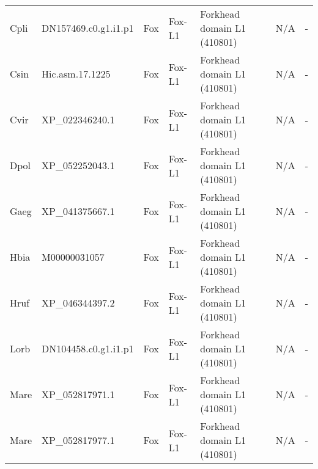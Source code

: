 \documentclass[../main.tex]{subfiles}
\begin{document}
\begin{landscape}
\begin{longtable}{lllllll}
		Cpli           & DN157469.c0.g1.i1.p1  & Fox            & Fox-L1              & Forkhead domain L1 (410801)                 & N/A                                                                    & -                    \\
		Csin           & Hic.asm.17.1225       & Fox            & Fox-L1              & Forkhead domain L1 (410801)                 & N/A                                                                    & -                    \\
		Cvir           & XP\_022346240.1       & Fox            & Fox-L1              & Forkhead domain L1 (410801)                 & N/A                                                                    & -                    \\
		Dpol           & XP\_052252043.1       & Fox            & Fox-L1              & Forkhead domain L1 (410801)                 & N/A                                                                    & -                    \\
		Gaeg           & XP\_041375667.1       & Fox            & Fox-L1              & Forkhead domain L1 (410801)                 & N/A                                                                    & -                    \\
		Hbia           & M00000031057          & Fox            & Fox-L1              & Forkhead domain L1 (410801)                 & N/A                                                                    & -                    \\
		Hruf           & XP\_046344397.2       & Fox            & Fox-L1              & Forkhead domain L1 (410801)                 & N/A                                                                    & -                    \\
		Lorb           & DN104458.c0.g1.i1.p1  & Fox            & Fox-L1              & Forkhead domain L1 (410801)                 & N/A                                                                    & -                    \\
		Mare           & XP\_052817971.1       & Fox            & Fox-L1              & Forkhead domain L1 (410801)                 & N/A                                                                    & -                    \\
		Mare           & XP\_052817977.1       & Fox            & Fox-L1              & Forkhead domain L1 (410801)                 & N/A                                                                    & -                    \\

\end{longtable}
\end{landscape}
\end{document}
